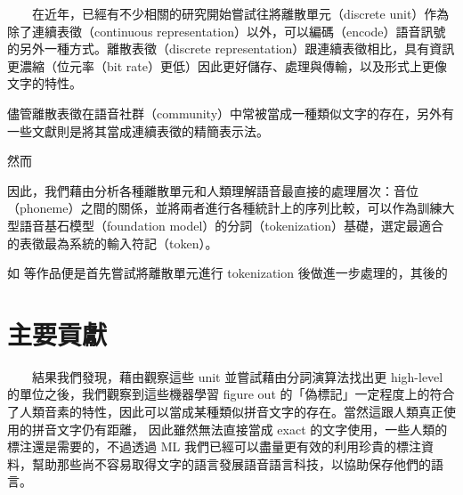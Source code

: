 　　在近年，已經有不少相關的研究開始嘗試往將離散單元（discrete unit）作為除了連續表徵（continuous representation）以外，可以編碼（encode）語音訊號的另外一種方式。離散表徵（discrete representation）跟連續表徵相比，具有資訊更濃縮（位元率（bit rate）更低）因此更好儲存、處理與傳輸，以及形式上更像文字的特性。

    儘管離散表徵在語音社群（community）中常被當成一種類似文字的存在，另外有一些文獻則是將其當成連續表徵的精簡表示法。

    然而

    因此，我們藉由分析各種離散單元和人類理解語音最直接的處理層次：音位（phoneme）之間的關係，並將兩者進行各種統計上的序列比較，可以作為訓練大型語音基石模型（foundation model）的分詞（tokenization）基礎，選定最適合的表徵最為系統的輸入符記（token）。

    如 \cite{wu2023wav2seq} 等作品便是首先嘗試將離散單元進行 tokenization 後做進一步處理的，其後的


\section{主要貢獻}  %

　　結果我們發現，藉由觀察這些 unit 並嘗試藉由分詞演算法找出更 high-level 的單位之後，我們觀察到這些機器學習 figure out 的「偽標記」一定程度上的符合了人類音素的特性，因此可以當成某種類似拼音文字的存在。當然這跟人類真正使用的拼音文字仍有距離，
因此雖然無法直接當成 exact 的文字使用，一些人類的標注還是需要的，不過透過 ML 我們已經可以盡量更有效的利用珍貴的標注資料，幫助那些尚不容易取得文字的語言發展語音語言科技，以協助保存他們的語言。


